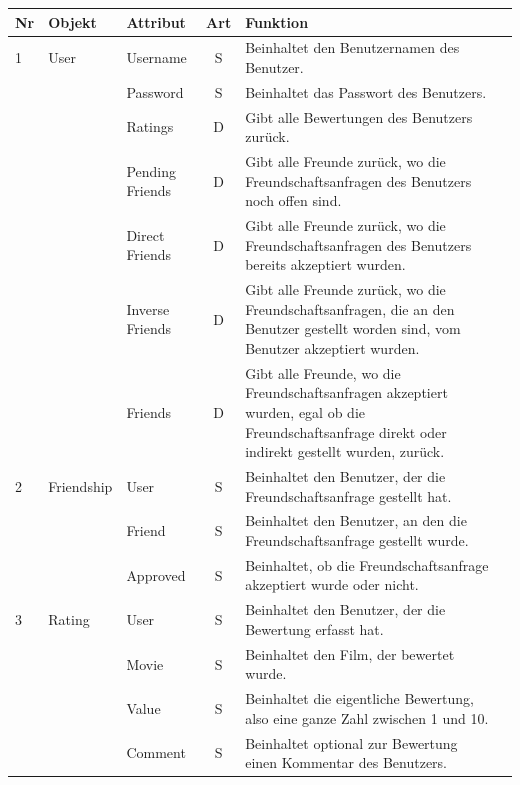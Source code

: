 \begin{table}[ht]
\begin{center}
    \begin{tabular}{lllcp{9cm}l}
        \toprule Nr & Objekt & Attribut & Art & Funktion \\
        \midrule
            1 & User & Username & S & Beinhaltet den Benutzernamen des Benutzer. \\
            & & Password & S & Beinhaltet das Passwort des Benutzers. \\
            & & Ratings & D & Gibt alle Bewertungen des Benutzers zurück. \\
            & & Pending Friends & D & Gibt alle Freunde zurück, wo die Freundschaftsanfragen
                                      des Benutzers noch offen sind. \\
            & & Direct Friends & D & Gibt alle Freunde zurück, wo die Freundschaftsanfragen
                                     des Benutzers bereits akzeptiert wurden. \\
            & & Inverse Friends & D & Gibt alle Freunde zurück, wo die Freundschaftsanfragen,
                                      die an den Benutzer gestellt worden sind, vom Benutzer
                                      akzeptiert wurden. \\
            & & Friends & D & Gibt alle Freunde, wo die Freundschaftsanfragen akzeptiert wurden,
                              egal ob die Freundschaftsanfrage direkt oder indirekt gestellt
                              wurden, zurück. \\
        \midrule
            2 & Friendship & User & S & Beinhaltet den Benutzer, der die Freundschaftsanfrage
                                        gestellt hat. \\
            & & Friend & S & Beinhaltet den Benutzer, an den die Freundschaftsanfrage gestellt
                                        wurde. \\
            & & Approved & S & Beinhaltet, ob die Freundschaftsanfrage akzeptiert wurde oder nicht. \\
        \midrule
            3 & Rating & User & S & Beinhaltet den Benutzer, der die Bewertung erfasst hat. \\
            & & Movie & S & Beinhaltet den Film, der bewertet wurde. \\
            & & Value & S & Beinhaltet die eigentliche Bewertung, also eine ganze Zahl zwischen 1 und 10. \\
            & & Comment & S & Beinhaltet optional zur Bewertung einen Kommentar des Benutzers. \\

\end{tabular}
\end{center}
\end{table}

